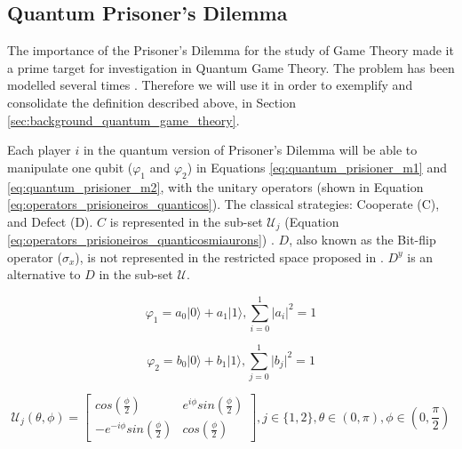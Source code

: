 \subsection{Quantum Prisoner's Dilemma}
\label{subsubsec:quantum_prisioners_dillema}

The importance of the Prisoner's Dilemma for the study of Game Theory made it a prime target for investigation in Quantum Game Theory. The problem has been modelled several times \cite{Eisert2008}\cite{Letters2002}. Therefore we will use it in order to exemplify and consolidate the definition described above, in Section \ref{sec:background_quantum_game_theory}\cite{Fra2011a}. 

Each player $i$ in the quantum version of Prisoner's Dilemma will be able to manipulate one qubit ($\varphi_{1}$ and $\varphi_{2}$) in Equations \eqref{eq:quantum_prisioner_m1} and \eqref{eq:quantum_prisioner_m2}, with the unitary operators (shown in Equation \eqref{eq:operators_prisioneiros_quanticos}). The  classical strategies: Cooperate (C), and Defect (D). $C$ is represented in the sub-set $\mathcal{U}_{j}$ (Equation \eqref{eq:operators_prisioneiros_quanticosmiaurons}) . $D$, also known as the Bit-flip operator ($\sigma_{x}$), is not represented in the restricted space proposed in \cite{Eisert2008}\cite{Fra2011a}. $D^{y}$ is an alternative to $D$ in the sub-set $\mathcal{U}$.

\begin{equation}
\varphi_{1}=a_{0}\vert0\rangle+a_{1}\vert1\rangle,\sum_{i=0}^{1}\vert a_{i}\vert^{2}=1
\label{eq:quantum_prisioner_m1}
\end{equation}


\begin{equation}
\varphi_{2}=b_{0}\vert0\rangle+b_{1}\vert1\rangle,\sum_{j=0}^{1}\vert b_{j}\vert^{2}=1
\label{eq:quantum_prisioner_m2}
\end{equation}

\begin{equation}
\mathcal{U}_{j} ( \theta,\phi) = \left[\begin{array}{cc}
cos(\frac{\phi}{2}) & e^{i\phi}sin(\frac{\phi}{2})\\
-e^{-i\phi}sin(\frac{\phi}{2}) & cos(\frac{\phi}{2})
\end{array}\right] , j \in \{ 1, 2\}, \theta \in ( 0, \pi ) , \phi \in ( 0, \frac{\pi}{2})
\label{eq:operators_prisioneiros_quanticos}
\end{equation}

